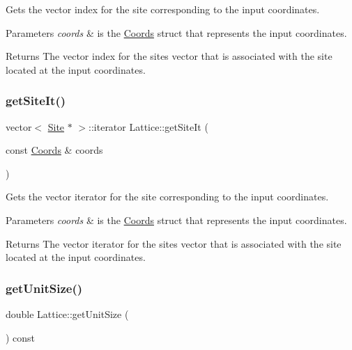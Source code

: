 Gets the vector index for the site corresponding to the input coordinates. 


\begin{DoxyParams}{Parameters}
{\em coords} & is the \hyperlink{struct_coords}{Coords} struct that represents the input coordinates. \\
\hline
\end{DoxyParams}
\begin{DoxyReturn}{Returns}
The vector index for the sites vector that is associated with the site located at the input coordinates. 
\end{DoxyReturn}
\mbox{\label{class_lattice_a46f7d12855d24e1bdd02814621b0a178}} 
\subsubsection{\texorpdfstring{get\+Site\+It()}{getSiteIt()}}
{\footnotesize\ttfamily vector$<$ \hyperlink{class_site}{Site} $\ast$ $>$\+::iterator Lattice\+::get\+Site\+It (\begin{DoxyParamCaption}\item[{const \hyperlink{struct_coords}{Coords} \&}]{coords }\end{DoxyParamCaption})}



Gets the vector iterator for the site corresponding to the input coordinates. 


\begin{DoxyParams}{Parameters}
{\em coords} & is the \hyperlink{struct_coords}{Coords} struct that represents the input coordinates. \\
\hline
\end{DoxyParams}
\begin{DoxyReturn}{Returns}
The vector iterator for the sites vector that is associated with the site located at the input coordinates. 
\end{DoxyReturn}
\mbox{\label{class_lattice_ac6963a6b2b4b8d96d3417f6e9c2a509d}} 
\subsubsection{\texorpdfstring{get\+Unit\+Size()}{getUnitSize()}}
{\footnotesize\ttfamily double Lattice\+::get\+Unit\+Size (\begin{DoxyParamCaption}{ }\end{DoxyParamCaption}) const}



